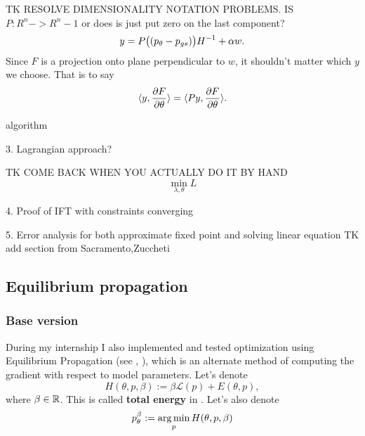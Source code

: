 \documentclass[a4paper,10pt]{report}
\begin{document}
TK RESOLVE DIMENSIONALITY NOTATION PROBLEMS. IS $P:R^n ->R^n-1$ or does is just put zero on the last component?
\begin{equation}
 y = P\big((p_\theta-p_{gs})\big)H^{-1} + \alpha w.
\end{equation}
Since $F$ is a projection onto plane perpendicular to $w$, it shouldn't matter which $y$ we choose.
That is to say
\begin{equation}
 \langle y,  \frac{\partial F}{\partial \theta} \rangle=\langle Py, \frac{\partial F}{\partial \theta} \rangle.
\end{equation}


algorithm




3. Lagrangian approach?

TK COME BACK WHEN YOU ACTUALLY DO IT BY HAND
 \begin{equation}
\min_{\lambda,\theta} L
 \end{equation}

4. Proof of IFT with constraints converging

5. Error analysis for both approximate fixed point and solving linear equation
TK add section from Sacramento,Zuccheti
\subsection{ Equilibrium propagation}

\subsubsection{Base version}
During my internship I also implemented and tested optimization using Equilibrium Propagation (see \cite{eqprop}, \cite{zucchet2022beyond}), which is an alternate method of computing the gradient with respect to model parameters.
Let's denote
\begin{equation}
H(\theta, p, \beta) := \beta \mathcal{L}(p) + E(\theta, p),
\end{equation}
where $\beta \in \mathbb{R}$.
 This is called \textbf{total energy} in \cite{eqprop}. Let's also denote
\begin{equation}
p_{\theta}^{\beta}:=\operatorname*{arg\,min}_p H(\theta, p, \beta)
\end{equation}
\end{document}
